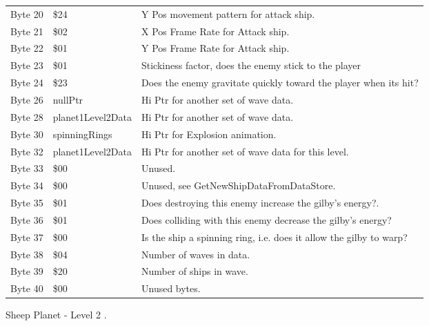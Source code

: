 \begin{figure}[H]
{\begin{adjustbox}{width=12cm}
\begin{tabular}{lll}
 Byte 20 & \$24               & Y Pos movement pattern for attack ship.                            \\
 Byte 21 & \$02               & X Pos Frame Rate for Attack ship.                                  \\
 Byte 22 & \$01               & Y Pos Frame Rate for Attack ship.                                  \\
 Byte 23 & \$01               & Stickiness factor, does the enemy stick to the player              \\
 Byte 24 & \$23               & Does the enemy gravitate quickly toward the player when its hit?   \\
 Byte 26 & nullPtr           & Hi Ptr for another set of wave data.                               \\
 Byte 28 & planet1Level2Data & Hi Ptr for another set of wave data.                               \\
 Byte 30 & spinningRings     & Hi Ptr for Explosion animation.                                    \\
 Byte 32 & planet1Level2Data & Hi Ptr for another set of wave data for this level.                \\
 Byte 33 & \$00               & Unused.                                                            \\
 Byte 34 & \$00               & Unused, see GetNewShipDataFromDataStore.                           \\
 Byte 35 & \$01               & Does destroying this enemy increase the gilby's energy?.           \\
 Byte 36 & \$01               & Does colliding with this enemy decrease the gilby's energy?        \\
 Byte 37 & \$00               & Is the ship a spinning ring, i.e. does it allow the gilby to warp? \\
 Byte 38 & \$04               & Number of waves in data.                                           \\
 Byte 39 & \$20               & Number of ships in wave.                                           \\
 Byte 40 & \$00               & Unused bytes.                                                      \\
\bottomrule
\end{tabular}

  \end{adjustbox}

  }\caption*{Sheep Planet - Level 2
.}
\end{figure}

